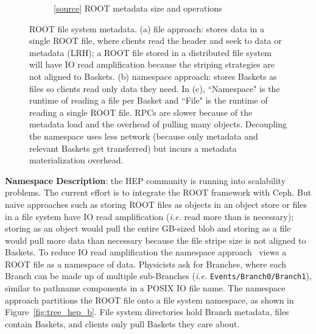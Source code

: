 \begin{figure}[tb]
\begin{subfigure}[b]{.4\linewidth}
      \caption{
      [\href{https://github.com/michaelsevilla/tintenfisch-popper/blob/master/pipelines/hep/visualize/viz.ipynb}{source}]
      ROOT metadata size and operations}
      \label{fig:hep_runtime}
    \end{subfigure}
\caption{ROOT file system metadata. (a) file approach: stores data in a single
ROOT file, where clients read the header and seek to data or metadata (LRH); a
ROOT file stored in a distributed file system will have IO read amplification
because the striping strategies are not aligned to Baskets. (b) namespace
approach: stores Baskets as files so clients read only data they need. In (c),
``Namespace" is the runtime of reading a file per Basket and ``File" is the
runtime of reading a single ROOT file. RPCs are slower because of the metadata
load and the overhead of pulling many objects.  Decoupling the namespace uses
less network (because only metadata and relevant Baskets get transferred) but
incurs a metadata materialization overhead.}
\end{figure}

\textbf{Namespace Description}: the HEP community is running into scalability
problems.  The current effort is to integrate the ROOT framework with Ceph. But
naive approaches such as storing ROOT files as objects in an object store or
files in a file system have IO read amplification ({\it i.e.} read more than is
necessary); storing as an object would pull the entire GB-sized blob and
storing as a file would pull more data than necessary because the file stripe
size is not aligned to Baskets.  To reduce IO read amplification the namespace
approach~\cite{pivarski:indico17-root} views a ROOT file as a namespace of
data.  Physicists ask for Branches, where each Branch can be made up of
multiple sub-Branches ({\it i.e.} \texttt{Events/Branch0/Branch1}), similar to
pathname components in a POSIX IO file name. The namespace approach
partitions the ROOT file onto a file system namespace, as shown in
Figure~\ref{fig:tree_hep_b}. File system directories hold Branch metadata,
files contain Baskets, and clients only pull Baskets they care about.


